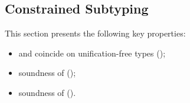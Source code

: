 
\subsection{Constrained Subtyping}%
\label{subsec:props-subtyctr-proof}

This section presents the following key properties:
\begin{itemize}
    \item {} and  coincide on
        unification-free types ();
    \item soundness of 
        ();
    \item soundness of \solvectrdflt ().
\end{itemize}

